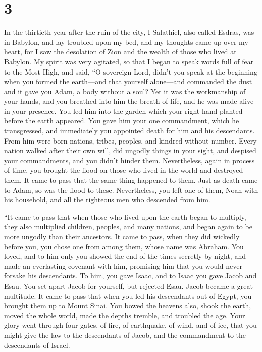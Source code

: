 \hypertarget{section-2}{%
\section{3}\label{section-2}}

 In the thirtieth year after the ruin of the city, I
Salathiel, also called Esdras, was in Babylon, and lay troubled upon my
bed, and my thoughts came up over my heart,  for I saw the
desolation of Zion and the wealth of those who lived at Babylon.
 My spirit was very agitated, so that I began to speak words
full of fear to the Most High, and said,  ``O sovereign
Lord, didn't you speak at the beginning when you formed the earth---and
that yourself alone---and commanded the dust  and it gave
you Adam, a body without a soul? Yet it was the workmanship of your
hands, and you breathed into him the breath of life, and he was made
alive in your presence.  You led him into the garden which
your right hand planted before the earth appeared.  You gave
him your one commandment, which he transgressed, and immediately you
appointed death for him and his descendants. From him were born nations,
tribes, peoples, and kindred without number.  Every nation
walked after their own will, did ungodly things in your sight, and
despised your commandments, and you didn't hinder them. 
Nevertheless, again in process of time, you brought the flood on those
who lived in the world and destroyed them.  It came to pass
that the same thing happened to them. Just as death came to Adam, so was
the flood to these.  Nevertheless, you left one of them,
Noah with his household, and all the righteous men who descended from
him.

 ``It came to pass that when those who lived upon the earth
began to multiply, they also multiplied children, peoples, and many
nations, and began again to be more ungodly than their ancestors.
 It came to pass, when they did wickedly before you, you
chose one from among them, whose name was Abraham.  You
loved, and to him only you showed the end of the times secretly by
night,  and made an everlasting covenant with him,
promising him that you would never forsake his descendants. To him, you
gave Isaac, and to Isaac you gave Jacob and Esau.  You set
apart Jacob for yourself, but rejected Esau. Jacob became a great
multitude.  It came to pass that when you led his
descendants out of Egypt, you brought them up to Mount Sinai.
 You bowed the heavens also, shook the earth, moved the
whole world, made the depths tremble, and troubled the age.
 Your glory went through four gates, of fire, of
earthquake, of wind, and of ice, that you might give the law to the
descendants of Jacob, and the commandment to the descendants of Israel.


